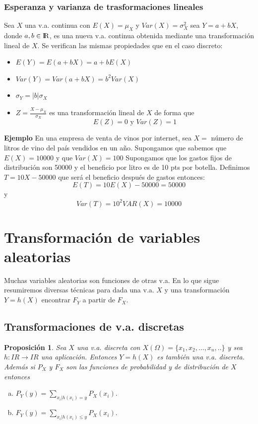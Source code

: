 \documentclass[12pt]{report}
\newtheorem{proposition}[definition]{Proposici\'on}
\def\R{I\!\!R}
\begin{document}
    \subsubsection{Esperanza y varianza de trasformaciones lineales}
    Sea $X$ una v.a. continua con $E(X)=\mu_{X}$ y $Var(X)=\sigma_{X}^{2}$ sea $Y=a+b X$, donde
$a,b\in\mbox{I\kern-.2em\hbox{R}}$, es una nueva v.a. continua obtenida mediante una transformación lineal de $X$.
Se verifican las mismas propiedades que en el caso discreto:
 \begin{itemize}
     \item  $E(Y)=E(a+b X)=a+b E(X)$
     \item $Var(Y)=Var(a+b X)=b^{2} Var(X)$
      \item $\sigma_{Y}=|b| \sigma_{X}$
      \item $Z=\frac{X-\mu_{X}}{\sigma_{X}}$ es una transformación
      lineal de $X$ de forma que
      $$E(Z)=0 \mbox{ y } Var(Z)=1$$
 \end{itemize}

            \textbf{Ejemplo}
            En una empresa de venta de vinos por internet, sea
            $X=$ número de  litros de vino del país vendidos en un año.
            Supongamos que sabemos que $E(X)=10000$ y que $Var(X)=100$
            Supongamos que los gastos fijos de distribución son
            50000 y el beneficio por litro es de 10 pts por botella.
            Definimos $T=10 X-50000$ que será el beneficio después de gastos
            entonces:
            $$E(T)=10 E(X)-50000 = 50000$$
            y
            $$Var(T)=10^2 VAR(X)= 10000$$


\section{Transformación de variables aleatorias}


          Muchas variables aleatorias son funciones de otras v.a. En lo que
          sigue resumiremos diversas técnicas para dada una v.a. $X$ y una
          transformación $Y=h(X)$  encontrar $F_{Y}$ a
          partir de $F_{X}$.


          \subsection{Transformaciones de v.a. discretas}

        \begin{proposition}
        Sea $X$ una v.a. discreta con \newline
        $X(\Omega)=\{x_{1},x_{2},\ldots,x_{n},..\}$ y sea $h:\R\to\R$ una aplicación.
        Entonces $Y=h(X)$ es también una v.a. discreta. Además si $P_X$
        y $F_{X}$ son las funciones de probabilidad y de distribución de
        $X$ entonces

        \begin{enumerate}[a)]
        \item $\displaystyle P_{Y}(y)=\sum_{x_{i}|h(x_{i})=y}P_X(x_{i}).$
        \item $\displaystyle F_{Y}(y)=\sum_{x_{i}|h(x_{i})\leq y} P_X(x_{i}).$
        \end{enumerate}
\end{proposition}
\end{document}
